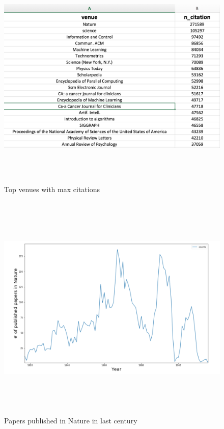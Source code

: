 \documentclass[a4paper, 11pt]{article}
\begin{document}
\begin{figure}[h]
    \centering
    \includegraphics[width=17cm,height=11cm]{top_venues}
    \caption{Top venues with max citations}
    \label{fig:top_venues}
\end{figure}

\begin{figure}[h]
    \centering
    \includegraphics[width=17cm,height=11cm]{nature_year_wise}
    \caption{Papers published in Nature in last century}
    \label{fig:nature_year_wise}
\end{figure}
\end{document}
